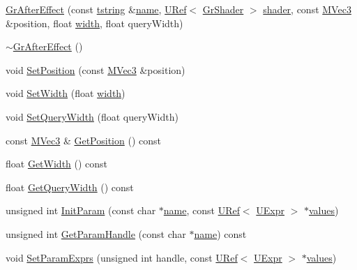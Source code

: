 \begin{CompactItemize}
\item 
\hyperlink{class_gr_after_effect_99b71b5f881a5e958b9cc9f1c9c4e571}{GrAfterEffect} (const \hyperlink{common__afx_8h_816fa58fd77499b0edb2c69ebe803d5c}{tstring} \&\hyperlink{glext__bak_8h_bb62efe59ccdd153ce42e1a418352209}{name}, \hyperlink{class_u_ref}{URef}$<$ \hyperlink{class_gr_shader}{GrShader} $>$ \hyperlink{glext_8h_57b2a96adb1d51204909a82d861e395e}{shader}, const \hyperlink{class_m_vec3}{MVec3} \&position, float \hyperlink{wglext_8h_e6531b1788ca42a9ae8155b0c52e7630}{width}, float queryWidth)
\item 
\hyperlink{class_gr_after_effect_f62d61f3e398d41ef45843d37a4cd6ca}{$\sim$GrAfterEffect} ()
\item 
void \hyperlink{class_gr_after_effect_6eef8c6b93d6faa7995b4ff42ea1a3cc}{SetPosition} (const \hyperlink{class_m_vec3}{MVec3} \&position)
\item 
void \hyperlink{class_gr_after_effect_e692a8aa9358c8228aed2f0c69dedb8c}{SetWidth} (float \hyperlink{wglext_8h_e6531b1788ca42a9ae8155b0c52e7630}{width})
\item 
void \hyperlink{class_gr_after_effect_b4c169cb494a24fd5c867bc7132c860b}{SetQueryWidth} (float queryWidth)
\item 
const \hyperlink{class_m_vec3}{MVec3} \& \hyperlink{class_gr_after_effect_d79a8c6ea1f445e34889587d205e5b55}{GetPosition} () const 
\item 
float \hyperlink{class_gr_after_effect_9c9c819b5a476c965ad41b76e1b284dc}{GetWidth} () const 
\item 
float \hyperlink{class_gr_after_effect_3725e6efbe22dd48c67ca96fdbe33855}{GetQueryWidth} () const 
\item 
unsigned int \hyperlink{class_gr_after_effect_28a716f513169ba2179de9b389e2be8e}{InitParam} (const char $\ast$\hyperlink{glext__bak_8h_bb62efe59ccdd153ce42e1a418352209}{name}, const \hyperlink{class_u_ref}{URef}$<$ \hyperlink{class_u_expr}{UExpr} $>$ $\ast$\hyperlink{glext__bak_8h_787b90126e660bfa88ef8aa99f74ca41}{values})
\item 
unsigned int \hyperlink{class_gr_after_effect_079dd4c9fb631908bf9b2d133c733280}{GetParamHandle} (const char $\ast$\hyperlink{glext__bak_8h_bb62efe59ccdd153ce42e1a418352209}{name}) const 
\item 
void \hyperlink{class_gr_after_effect_0d1ed187d78661ae8148296906ef22a4}{SetParamExprs} (unsigned int handle, const \hyperlink{class_u_ref}{URef}$<$ \hyperlink{class_u_expr}{UExpr} $>$ $\ast$\hyperlink{glext__bak_8h_787b90126e660bfa88ef8aa99f74ca41}{values})

\end{CompactItemize}
